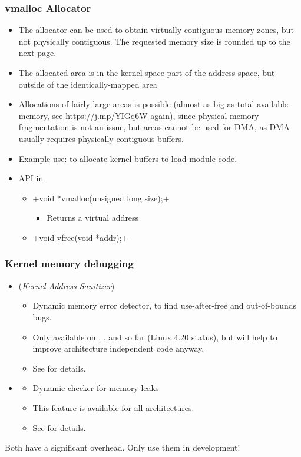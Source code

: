 \begin{frame}[fragile]
  \frametitle{vmalloc Allocator}
  \begin{itemize}
  \item The  allocator can be used to obtain virtually
    contiguous memory zones, but not physically contiguous. The
    requested memory size is rounded up to the next page.
  \item The allocated area is in the kernel space part of the address
    space, but outside of the identically-mapped area
  \item Allocations of fairly large areas is possible (almost as big
    as total available memory, see \url{https://j.mp/YIGq6W} again),
    since physical memory fragmentation is not an issue, but areas
    cannot be used for DMA, as DMA usually requires physically
    contiguous buffers.
  \item Example use: to allocate kernel buffers to load module code.
  \item API in 
    \begin{itemize}
    \item {}+void *vmalloc(unsigned long size);+
      \begin{itemize}
      \item Returns a virtual address
      \end{itemize}
    \item {}+void vfree(void *addr);+
    \end{itemize}
  \end{itemize}
\end{frame}

\begin{frame}
  \frametitle{Kernel memory debugging}
  \begin{itemize}
  \item {} ({\em Kernel Address Sanitizer})
    \begin{itemize}
    \item Dynamic memory error detector, to find use-after-free and
      out-of-bounds bugs.
    \item Only available on , ,  and
       so far (Linux 4.20 status), but will help to improve
      architecture independent code anyway.
    \item See  for details.
    \end{itemize}
  \item {}
    \begin{itemize}
    \item Dynamic checker for memory leaks
    \item This feature is available for all architectures.
    \item See  for details.
    \end{itemize}
  \end{itemize}
  Both have a significant overhead. Only use them in development!
\end{frame}

